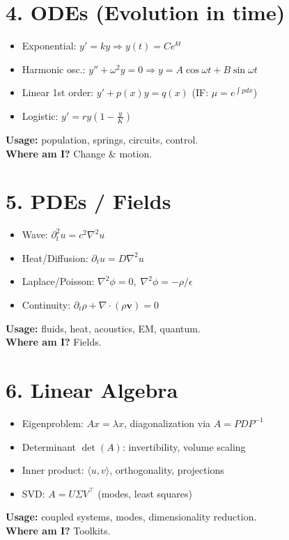 \documentclass[12pt]{article}
\newcommand{\usage}[1]{\textbf{Usage:} #1}
\newcommand{\where}[1]{\textbf{Where am I?} #1}
\begin{document}
\newpage
\section*{4. ODEs (Evolution in time)}
\begin{itemize}
  \item Exponential: \(y' = k y \Rightarrow y(t)=C e^{kt}\)
  \item Harmonic osc.: \(y''+\omega^2 y=0 \Rightarrow y=A\cos\omega t + B\sin\omega t\)
  \item Linear 1st order: \(y' + p(x)y = q(x)\) \; (IF: \(\mu=e^{\int p dx}\))
  \item Logistic: \(y' = r y(1-\frac{y}{K})\)
\end{itemize}
\usage{population, springs, circuits, control.}\\
\where{Change \& motion.}

\newpage
\section*{5. PDEs / Fields}
\begin{itemize}
  \item Wave: \(\partial_t^2 u = c^2 \nabla^2 u\)
  \item Heat/Diffusion: \(\partial_t u = D \nabla^2 u\)
  \item Laplace/Poisson: \(\nabla^2 \phi = 0,\; \nabla^2 \phi = -\rho/\epsilon\)
  \item Continuity: \(\partial_t \rho + \nabla\!\cdot(\rho \mathbf v)=0\)
\end{itemize}
\usage{fluids, heat, acoustics, EM, quantum.}\\
\where{Fields.}

\newpage
\section*{6. Linear Algebra}
\begin{itemize}
  \item Eigenproblem: \(A x = \lambda x\), \; diagonalization via \(A = PDP^{-1}\)
  \item Determinant \(\det(A)\): invertibility, volume scaling
  \item Inner product: \(\langle u,v\rangle\), orthogonality, projections
  \item SVD: \(A = U \Sigma V^\top\) (modes, least squares)
\end{itemize}
\usage{coupled systems, modes, dimensionality reduction.}\\
\where{Toolkits.}
\end{document}

